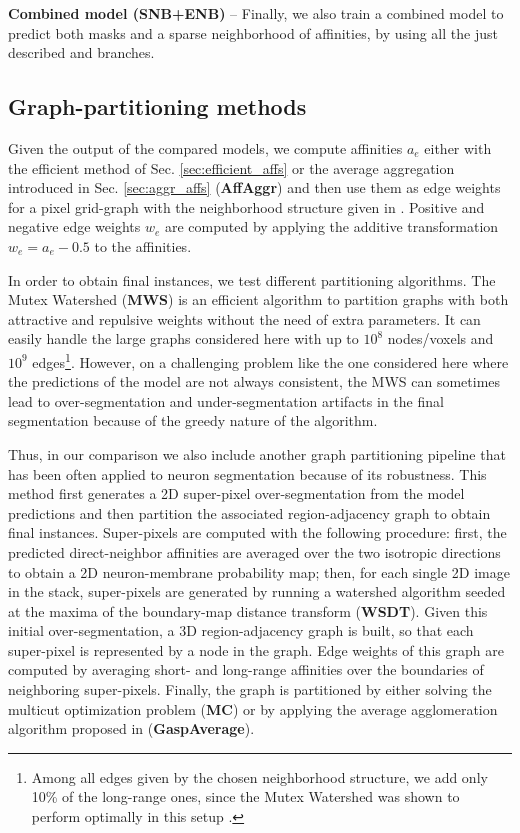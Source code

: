 \textbf{Combined model (SNB+ENB)} -- Finally, we also train a combined model to predict both \maskname masks and a sparse neighborhood of affinities, by using all the just described \emph{\encBr} and \emph{\sparseBr} branches.  

\subsection{Graph-partitioning methods} 
Given the output of the compared models, we compute affinities $a_e$ either with the efficient method of Sec. \ref{sec:efficient_affs} or the average aggregation introduced in Sec. \ref{sec:aggr_affs} (\textbf{AffAggr}) and then use them as edge weights for a pixel grid-graph with the neighborhood structure given in . Positive and negative edge weights $w_e$ are computed by applying the additive transformation $w_e=a_e-0.5$ to the affinities.

In order to obtain final instances, we test different partitioning algorithms.
The Mutex Watershed (\textbf{MWS}) \cite{wolf2018mutex} is an efficient algorithm to partition graphs with both attractive and repulsive weights without the need of extra parameters. It can easily handle the large graphs considered here with up to $10^8$ nodes/voxels and $10^9$ edges\footnote{Among all edges given by the chosen neighborhood structure, we add only 10\% of the long-range ones, since the Mutex Watershed was shown to perform optimally in this setup \cite{bailoni2019generalized,wolf2018mutex}.}. However, on a challenging problem like the one considered here where the predictions of the model are not always consistent, the MWS can sometimes lead to over-segmentation and under-segmentation artifacts in the final segmentation because of the greedy nature of the algorithm.

Thus, in our comparison we also include another graph partitioning pipeline that has been often applied to neuron segmentation because of its robustness. This method first generates a 2D super-pixel over-segmentation from the model predictions and then partition the associated region-adjacency graph to obtain final instances. Super-pixels are computed with the following procedure: first, the predicted direct-neighbor affinities are averaged over the two isotropic directions to obtain a 2D neuron-membrane probability map; then, for each single 2D image in the stack, super-pixels are generated by running a watershed algorithm seeded at the maxima of the boundary-map distance transform (\textbf{WSDT}). Given this initial over-segmentation, a 3D region-adjacency graph is built, so that each super-pixel is represented by a node in the graph. Edge weights of this graph are computed by averaging short- and long-range affinities over the boundaries of neighboring super-pixels. 
Finally, the graph is partitioned by either solving the multicut optimization problem (\textbf{MC}) or by applying the average agglomeration algorithm proposed in \cite{bailoni2019generalized} (\textbf{GaspAverage}).

